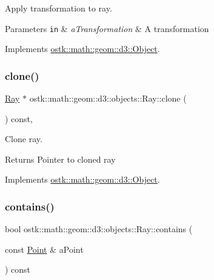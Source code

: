 Apply transformation to ray. 


\begin{DoxyParams}[1]{Parameters}
\mbox{\tt in}  & {\em a\+Transformation} & A transformation \\
\hline
\end{DoxyParams}


Implements \hyperlink{classostk_1_1math_1_1geom_1_1d3_1_1_object_ae9194dd6d2bb4df09292ffc84dccdb1d}{ostk\+::math\+::geom\+::d3\+::\+Object}.

\mbox{\label{classostk_1_1math_1_1geom_1_1d3_1_1objects_1_1_ray_aef341aa921aa184e1193c782e9198230}} 
\subsubsection{\texorpdfstring{clone()}{clone()}}
{\footnotesize\ttfamily \hyperlink{classostk_1_1math_1_1geom_1_1d3_1_1objects_1_1_ray}{Ray} $\ast$ ostk\+::math\+::geom\+::d3\+::objects\+::\+Ray\+::clone (\begin{DoxyParamCaption}{ }\end{DoxyParamCaption}) const\hspace{0.3cm}{\ttfamily [override]}, {\ttfamily [virtual]}}



Clone ray. 

\begin{DoxyReturn}{Returns}
Pointer to cloned ray 
\end{DoxyReturn}


Implements \hyperlink{classostk_1_1math_1_1geom_1_1d3_1_1_object_a676013f9555f6492687f9809b2db887b}{ostk\+::math\+::geom\+::d3\+::\+Object}.

\mbox{\label{classostk_1_1math_1_1geom_1_1d3_1_1objects_1_1_ray_a7a8791f8658c741fd8ce967511ed2f5f}} 
\subsubsection{\texorpdfstring{contains()}{contains()}\hspace{0.1cm}{\footnotesize\ttfamily [1/2]}}
{\footnotesize\ttfamily bool ostk\+::math\+::geom\+::d3\+::objects\+::\+Ray\+::contains (\begin{DoxyParamCaption}\item[{const \hyperlink{classostk_1_1math_1_1geom_1_1d3_1_1objects_1_1_point}{Point} \&}]{a\+Point }\end{DoxyParamCaption}) const}



